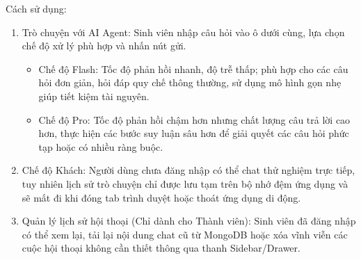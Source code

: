 \indent Cách sử dụng:
\begin{enumerate}
	\item Trò chuyện với AI Agent: Sinh viên nhập câu hỏi vào ô dưới cùng, lựa chọn chế độ xử lý phù hợp và nhấn nút gửi.
	\begin{itemize}
		\item Chế độ Flash: Tốc độ phản hồi nhanh, độ trễ thấp; phù hợp cho các câu hỏi đơn giản, hỏi đáp quy chế thông thường, sử dụng mô hình gọn nhẹ giúp tiết kiệm tài nguyên.
		\item Chế độ Pro: Tốc độ phản hồi chậm hơn nhưng chất lượng câu trả lời cao hơn, thực hiện các bước suy luận sâu hơn để giải quyết các câu hỏi phức tạp hoặc có nhiều ràng buộc.
	\end{itemize}
	\item Chế độ Khách: Người dùng chưa đăng nhập có thể chat thử nghiệm trực tiếp, tuy nhiên lịch sử trò chuyện chỉ được lưu tạm trên bộ nhớ đệm ứng dụng và sẽ mất đi khi đóng tab trình duyệt hoặc thoát ứng dụng di động.
	\item Quản lý lịch sử hội thoại (Chỉ dành cho Thành viên): Sinh viên đã đăng nhập có thể xem lại, tải lại nội dung chat cũ từ MongoDB hoặc xóa vĩnh viễn các cuộc hội thoại không cần thiết thông qua thanh Sidebar/Drawer.
\end{enumerate}
